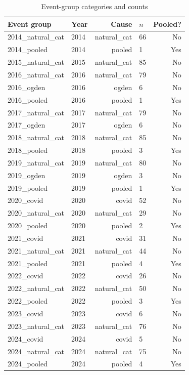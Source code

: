 \begin{table}[htbp]
\centering
\caption{Event-group categories and counts}
\label{tab:event_groups}
\begin{tabular}{llrlr}
\toprule
\textbf{Event group} & \textbf{Year} & \textbf{Cause} & \textbf{$n$} & \textbf{Pooled?} \\
\midrule
2014_natural_cat & 2014 & natural_cat & 66 & No \\
2014_pooled & 2014 & pooled & 1 & Yes \\
2015_natural_cat & 2015 & natural_cat & 85 & No \\
2016_natural_cat & 2016 & natural_cat & 79 & No \\
2016_ogden & 2016 & ogden & 6 & No \\
2016_pooled & 2016 & pooled & 1 & Yes \\
2017_natural_cat & 2017 & natural_cat & 79 & No \\
2017_ogden & 2017 & ogden & 6 & No \\
2018_natural_cat & 2018 & natural_cat & 85 & No \\
2018_pooled & 2018 & pooled & 3 & Yes \\
2019_natural_cat & 2019 & natural_cat & 80 & No \\
2019_ogden & 2019 & ogden & 3 & No \\
2019_pooled & 2019 & pooled & 1 & Yes \\
2020_covid & 2020 & covid & 52 & No \\
2020_natural_cat & 2020 & natural_cat & 29 & No \\
2020_pooled & 2020 & pooled & 2 & Yes \\
2021_covid & 2021 & covid & 31 & No \\
2021_natural_cat & 2021 & natural_cat & 44 & No \\
2021_pooled & 2021 & pooled & 4 & Yes \\
2022_covid & 2022 & covid & 26 & No \\
2022_natural_cat & 2022 & natural_cat & 50 & No \\
2022_pooled & 2022 & pooled & 3 & Yes \\
2023_covid & 2023 & covid & 6 & No \\
2023_natural_cat & 2023 & natural_cat & 76 & No \\
2024_covid & 2024 & covid & 5 & No \\
2024_natural_cat & 2024 & natural_cat & 75 & No \\
2024_pooled & 2024 & pooled & 4 & Yes \\
\bottomrule
\end{tabular}
\end{table}
